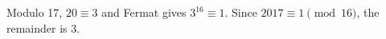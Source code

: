 Modulo 17, $ 20\equiv3 $ and Fermat gives $ 3^{16}\equiv1 $. Since $ 2017\equiv1\pmod{16}$, the remainder is $\boxed3 $.
